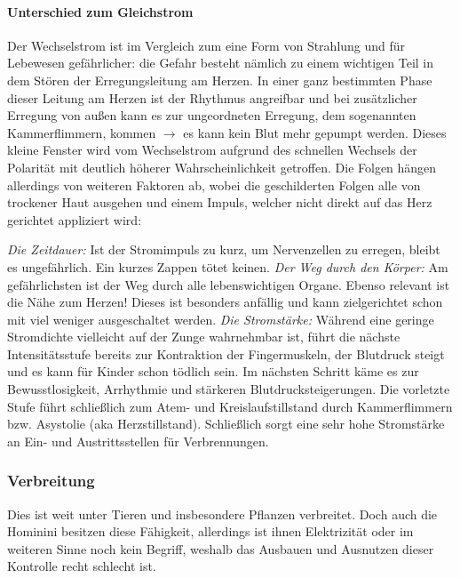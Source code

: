 \paragraph{Unterschied zum Gleichstrom}
Der Wechselstrom ist im Vergleich zum  eine Form von Strahlung und für Lebewesen gefährlicher:
die Gefahr besteht nämlich zu einem wichtigen Teil in dem Stören der Erregungsleitung am Herzen.
In einer ganz bestimmten Phase dieser Leitung am Herzen ist der Rhythmus angreifbar und bei zusätzlicher Erregung von außen kann es zur ungeordneten Erregung, dem sogenannten Kammerflimmern, kommen $\rightarrow$ es kann kein Blut mehr gepumpt werden.
Dieses kleine Fenster wird vom Wechselstrom aufgrund des schnellen Wechsels der Polarität mit deutlich höherer Wahrscheinlichkeit getroffen.
Die Folgen hängen allerdings von weiteren Faktoren ab, wobei die geschilderten Folgen alle von trockener Haut ausgehen und einem Impuls, welcher nicht direkt auf das Herz gerichtet appliziert wird:
\begin{outline}
	\1 \textit{Die Zeitdauer:} Ist der Stromimpuls zu kurz, um Nervenzellen zu erregen, bleibt es ungefährlich.
	Ein kurzes Zappen tötet keinen.
	\1 \textit{Der Weg durch den Körper:} Am gefährlichsten ist der Weg durch alle lebenswichtigen Organe.
	Ebenso relevant ist die Nähe zum Herzen!
	Dieses ist besonders anfällig und kann zielgerichtet schon mit viel weniger ausgeschaltet werden.
	\1 \textit{Die Stromstärke:} Während eine geringe Stromdichte vielleicht auf der Zunge wahrnehmbar ist, führt die nächste Intensitätsstufe bereits zur Kontraktion der Fingermuskeln, der Blutdruck steigt und es kann für Kinder schon tödlich sein. 
	Im nächsten Schritt käme es zur Bewusstlosigkeit, Arrhythmie und stärkeren Blutdrucksteigerungen.
	Die vorletzte Stufe führt schließlich zum Atem- und Kreislaufstillstand durch Kammerflimmern bzw. Asystolie (aka Herzstillstand).
	Schließlich sorgt eine sehr hohe Stromstärke an Ein- und Austrittsstellen für Verbrennungen.
\end{outline}

\subsubsection{Verbreitung}
Dies ist weit unter Tieren und insbesondere Pflanzen verbreitet. 
Doch auch die Hominini besitzen diese Fähigkeit, allerdings ist ihnen Elektrizität oder im weiteren Sinne noch kein Begriff, weshalb das Ausbauen und Ausnutzen dieser Kontrolle recht schlecht ist.

